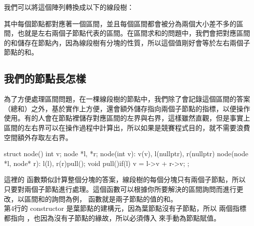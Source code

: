 \documentclass[main.tex]{subfiles}
\begin{document}
我們可以將這個陣列轉換成以下的線段樹：\\

\begin{center}

\end{center}

其中每個節點都對應著一個區間，並且每個區間都會被分為兩個大小差不多的區間，也就是左右兩個子節點代表的區間。在區間求和的問題中，我們會把對應區間的和儲存在節點內，因為線段樹有分塊的性質，所以這個值剛好會等於左右兩個子節點的和。\\

\subsection{我們的節點長怎樣}

為了方便處理區間問題，在一棵線段樹的節點中，我們除了會記錄這個區間的答案（總和）之外，基於實作上方便，還會額外儲存指向兩個子節點的指標，以便操作使用。有的人會在節點裡儲存對應區間的左界與右界，這樣雖然直觀，但是事實上區間的左右界可以在操作過程中計算出，所以如果是競賽程式目的，就不需要浪費空間額外存取左右界。\\

\begin{C++}
struct node(){
    int v;
    node *l, *r;
    node(int v): v(v), l(nullptr), r(nullptr){}
    node(node *l, node* r): l(l), r(r){pull();}
    void pull(){if(l) v = l->v + r->v;}
};
\end{C++}

這裡的  函數類似計算整個分塊的答案，線段樹的每個分塊只有兩個子節點，所以只要對兩個子節點進行處理。這個函數可以根據你所要解決的區間詢問而進行更改，以區間和的詢問為例，  函數就是兩子節點的值的和。\\

第$4$行的 constructor 是葉節點的建構元，因為葉節點沒有子節點，所以  兩個指標都指向 ，也因為沒有子節點的緣故，所以必須傳入  來手動為節點賦值。\\
\end{document}
